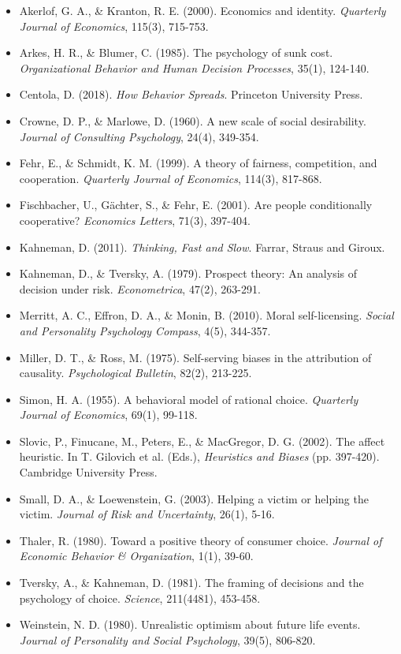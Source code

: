\documentclass[11pt,a4paper]{article}
\theoremstyle{definition}
\theoremstyle{plain}
\begin{document}
\begin{itemize}[leftmargin=*]
    \item Akerlof, G. A., \& Kranton, R. E. (2000). Economics and identity. \textit{Quarterly Journal of Economics}, 115(3), 715-753.
    \item Arkes, H. R., \& Blumer, C. (1985). The psychology of sunk cost. \textit{Organizational Behavior and Human Decision Processes}, 35(1), 124-140.
    \item Centola, D. (2018). \textit{How Behavior Spreads}. Princeton University Press.
    \item Crowne, D. P., \& Marlowe, D. (1960). A new scale of social desirability. \textit{Journal of Consulting Psychology}, 24(4), 349-354.
    \item Fehr, E., \& Schmidt, K. M. (1999). A theory of fairness, competition, and cooperation. \textit{Quarterly Journal of Economics}, 114(3), 817-868.
    \item Fischbacher, U., Gächter, S., \& Fehr, E. (2001). Are people conditionally cooperative? \textit{Economics Letters}, 71(3), 397-404.
    \item Kahneman, D. (2011). \textit{Thinking, Fast and Slow}. Farrar, Straus and Giroux.
    \item Kahneman, D., \& Tversky, A. (1979). Prospect theory: An analysis of decision under risk. \textit{Econometrica}, 47(2), 263-291.
    \item Merritt, A. C., Effron, D. A., \& Monin, B. (2010). Moral self-licensing. \textit{Social and Personality Psychology Compass}, 4(5), 344-357.
    \item Miller, D. T., \& Ross, M. (1975). Self-serving biases in the attribution of causality. \textit{Psychological Bulletin}, 82(2), 213-225.
    \item Simon, H. A. (1955). A behavioral model of rational choice. \textit{Quarterly Journal of Economics}, 69(1), 99-118.
    \item Slovic, P., Finucane, M., Peters, E., \& MacGregor, D. G. (2002). The affect heuristic. In T. Gilovich et al. (Eds.), \textit{Heuristics and Biases} (pp. 397-420). Cambridge University Press.
    \item Small, D. A., \& Loewenstein, G. (2003). Helping a victim or helping the victim. \textit{Journal of Risk and Uncertainty}, 26(1), 5-16.
    \item Thaler, R. (1980). Toward a positive theory of consumer choice. \textit{Journal of Economic Behavior \& Organization}, 1(1), 39-60.
    \item Tversky, A., \& Kahneman, D. (1981). The framing of decisions and the psychology of choice. \textit{Science}, 211(4481), 453-458.
    \item Weinstein, N. D. (1980). Unrealistic optimism about future life events. \textit{Journal of Personality and Social Psychology}, 39(5), 806-820.
\end{itemize}
\end{document}
